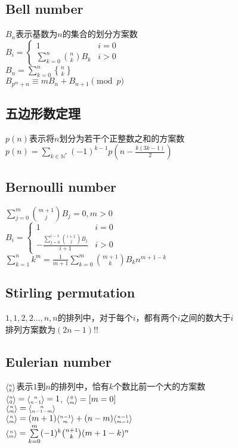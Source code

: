 	\subsection*{Bell number}
		$ B_n $表示基数为$ n $的集合的划分方案数
		\\$ B_i = \begin{cases}
			1 & i = 0\\
			\sum\limits_{k = 0}^{n} \binom{n}{k} B_k & i > 0
		\end{cases} $
		\\$ B_n = \sum\limits_{k = 0}^{n} {n \brace k} $
		\\$ B_{p^m + n} \equiv m B_n + B_{n + 1} \pmod p $
	\subsection*{五边形数定理}
		$ p(n) $表示将$ n $划分为若干个正整数之和的方案数
		\\$ p(n) = \sum\limits_{k \in \mathbb{N}^\ast} (-1)^{k - 1} p(n - \frac{k(3k - 1)}{2}) $
	\subsection*{Bernoulli number}
		\noindent$ \sum\limits_{j = 0}^{m} \binom{m + 1}{j} B_j = 0, m > 0 $
		\\$ B_i = \begin{cases}
			1 & i = 0\\
			-\frac{\sum\limits_{j = 0}^{i - 1} \binom{i + 1}{j} B_j}{i + 1} & i > 0
		\end{cases} $
		\\$ \sum\limits_{k = 1}^{n} k ^ m = \frac{1}{m + 1} \sum\limits_{k = 0}^{m} \binom{m + 1}{k} B_k n ^ {m + 1 - k} $
	\subsection*{Stirling permutation}
		$ 1, 1, 2, 2 \dots , n, n $的排列中，对于每个$ i $，都有两个$ i $之间的数大于$ i $
		\\排列方案数为$ (2n - 1)!! $
	\subsection*{Eulerian number}
		$ \eularian{n}{k} $表示$ 1 $到$ n $的排列中，恰有$ k $个数比前一个大的方案数
		\\$ \eularian{n}{0} = \eularian{n}{n - 1} = 1 $, $ \eularian{0}{m} = [m = 0] $
		\\$ \eularian{n}{m} = \eularian{n}{n - 1 - m} $
		\\$ \eularian{n}{m} = (m + 1) \eularian{n - 1}{m} + (n - m) \eularian{n - 1}{m - 1} $
		\\$ \eularian{n}{m} = \sum\limits_{k = 0}^{m} (-1)^k \binom{n + 1}{k} (m + 1 - k)^n $
